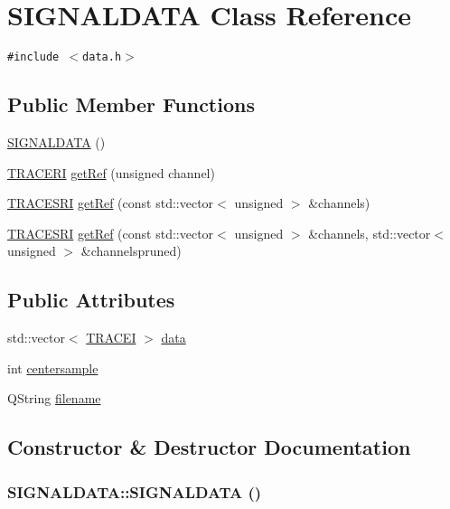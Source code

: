 \hypertarget{class_s_i_g_n_a_l_d_a_t_a}{
\section{SIGNALDATA Class Reference}
\label{class_s_i_g_n_a_l_d_a_t_a}
}
{\tt \#include $<$data.h$>$}

\subsection*{Public Member Functions}
\begin{CompactItemize}
\item 
\hyperlink{class_s_i_g_n_a_l_d_a_t_a_363c71c74fc75874e1155c8872002ec7}{SIGNALDATA} ()
\item 
\hyperlink{data_8h_fc86256a7f121caf21919387c9a373c7}{TRACERI} \hyperlink{class_s_i_g_n_a_l_d_a_t_a_4b9e7478c234c6ced9b9a7d63c91c092}{getRef} (unsigned channel)
\item 
\hyperlink{data_8h_cbba0387203ed452657771b112721cd1}{TRACESRI} \hyperlink{class_s_i_g_n_a_l_d_a_t_a_ebd15e42c0384ffc5c4a74d317228145}{getRef} (const std::vector$<$ unsigned $>$ \&channels)
\item 
\hyperlink{data_8h_cbba0387203ed452657771b112721cd1}{TRACESRI} \hyperlink{class_s_i_g_n_a_l_d_a_t_a_ac54d48e555a7b8a7e12c927cc90f311}{getRef} (const std::vector$<$ unsigned $>$ \&channels, std::vector$<$ unsigned $>$ \&channelspruned)
\end{CompactItemize}
\subsection*{Public Attributes}
\begin{CompactItemize}
\item 
std::vector$<$ \hyperlink{data_8h_63718d7c87eed943a40655be0dd70210}{TRACEI} $>$ \hyperlink{class_s_i_g_n_a_l_d_a_t_a_3731f410a1aeed974914860ddd089eeb}{data}
\item 
int \hyperlink{class_s_i_g_n_a_l_d_a_t_a_02abe023620a84cd4cdee2f6b7e7e989}{centersample}
\item 
QString \hyperlink{class_s_i_g_n_a_l_d_a_t_a_3e0058672e5c14f24c2502eb2c0b46f0}{filename}
\end{CompactItemize}


\subsection{Constructor \& Destructor Documentation}
\hypertarget{class_s_i_g_n_a_l_d_a_t_a_363c71c74fc75874e1155c8872002ec7}{
\subsubsection[{SIGNALDATA}]{\setlength{\rightskip}{0pt plus 5cm}SIGNALDATA::SIGNALDATA ()}}
\label{class_s_i_g_n_a_l_d_a_t_a_363c71c74fc75874e1155c8872002ec7}




